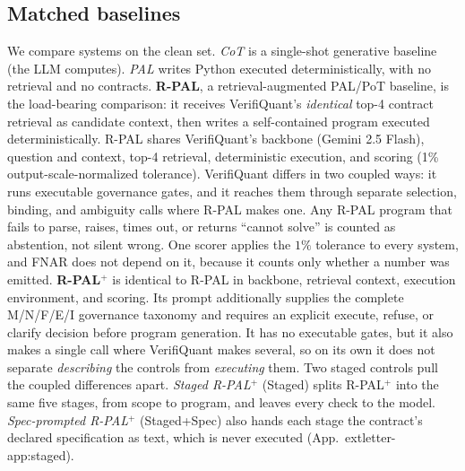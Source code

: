 \documentclass[sigconf]{acmart}
\newif\ifarxiv
\newcommand{\extref}[1]{App.~\ifarxiv\ref{#1}\else\csname extletter-#1\endcsname\fi}
\begin{document}
\subsection{Matched baselines}\label{sec:v2baselines}
We compare systems on the clean set.
\emph{CoT} is a single-shot generative baseline (the LLM computes).
\emph{PAL} writes Python executed deterministically, with no retrieval and no contracts.
\textbf{R-PAL}, a retrieval-augmented PAL/PoT baseline, is the load-bearing comparison: it receives VerifiQuant's \emph{identical} top-4 contract retrieval as candidate context, then writes a self-contained program executed deterministically.
R-PAL shares VerifiQuant's backbone (Gemini 2.5 Flash), question and context, top-4 retrieval, deterministic execution, and scoring (1\% output-scale-normalized tolerance). VerifiQuant differs in two coupled ways: it runs executable governance gates, and it reaches them through separate selection, binding, and ambiguity calls where R-PAL makes one.
Any R-PAL program that fails to parse, raises, times out, or returns ``cannot solve'' is counted as abstention, not silent wrong.
One scorer applies the $1\%$ tolerance to every system, and FNAR does not depend on it, because it counts only whether a number was emitted.
\textbf{R-PAL$^{+}$} is identical to R-PAL in backbone, retrieval context, execution environment, and scoring. Its prompt additionally supplies the complete M/N/F/E/I governance taxonomy and requires an explicit execute, refuse, or clarify decision before program generation. It has no executable gates, but it also makes a single call where VerifiQuant makes several, so on its own it does not separate \emph{describing} the controls from \emph{executing} them.
Two staged controls pull the coupled differences apart. \emph{Staged R-PAL$^{+}$} (Staged) splits R-PAL$^{+}$ into the same five stages, from scope to program, and leaves every check to the model. \emph{Spec-prompted R-PAL$^{+}$} (Staged+Spec) also hands each stage the contract's declared specification as text, which is never executed (\extref{app:staged}).
\end{document}
